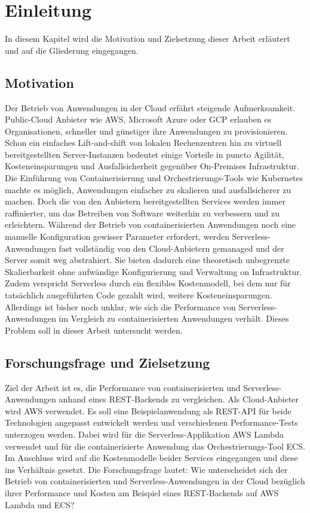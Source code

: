 \chapter{Einleitung}
In diesem Kapitel wird die Motivation und Zielsetzung dieser Arbeit erläutert und auf die Gliederung eingegangen.

\section{Motivation}
Der Betrieb von Anwendungen in der Cloud erfährt steigende Aufmerksamkeit. Public-Cloud Anbieter wie \ac{AWS}, Microsoft Azure oder \ac{GCP} erlauben es Organisationen, schneller und günstiger ihre Anwendungen zu provisionieren. Schon ein einfaches Lift-and-shift von lokalen Rechenzentren hin zu virtuell bereitgestellten Server-Instanzen bedeutet einige Vorteile in puncto Agilität, Kosteneinsparungen und Ausfallsicherheit gegenüber On-Premises Infrastruktur. Die Einführung von Containerisierung und Orchestrierungs-Tools wie Kubernetes machte es möglich, Anwendungen einfacher zu skalieren und ausfallsicherer zu machen. Doch die von den Anbietern bereitgestellten Services werden immer raffinierter, um das Betreiben von Software weiterhin zu verbessern und zu erleichtern. Während der Betrieb von containerisierten Anwendungen noch eine manuelle Konfiguration gewisser Parameter erfordert, werden Serverless-Anwendungen fast vollständig von den Cloud-Anbietern gemanaged und der Server somit weg abstrahiert. Sie bieten dadurch eine theoretisch unbegrenzte Skalierbarkeit ohne aufwändige Konfigurierung und Verwaltung  on Infrastruktur. Zudem verspricht Serverless durch ein flexibles Kostenmodell, bei dem nur für tatsächlich ausgeführten Code gezahlt wird, weitere Kosteneinsparungen. Allerdings ist bisher noch unklar, wie sich die Performance von Serverless-Anwendungen im Vergleich zu containerisierten Anwendungen verhält. Dieses Problem soll in dieser Arbeit untersucht werden. 

\section{Forschungsfrage und Zielsetzung}
Ziel der Arbeit ist es, die Performance von containerisierten und Serverless-Anwendungen anhand eines REST-Backends zu vergleichen. Als Cloud-\linebreak Anbieter wird \ac{AWS} verwendet. Es soll eine Beispielanwendung als REST-API für beide Technologien angepasst entwickelt werden und verschiedenen Performance-Tests unterzogen werden. Dabei wird für die Serverless-Applikation \ac{AWS} Lambda verwendet und für die containerisierte Anwendung das Orchestrierungs-Tool \ac{ECS}. Im Anschluss wird auf die Kostenmodelle beider Services eingegangen und diese ins Verhältnis gesetzt.
\newpage
Die Forschungsfrage lautet: Wie unterscheidet sich der Betrieb von containerisierten und Serverless-Anwendungen in der Cloud bezüglich ihrer Performance und Kosten am Beispiel eines REST-Backends auf \ac{AWS} Lambda und \ac{ECS}?

